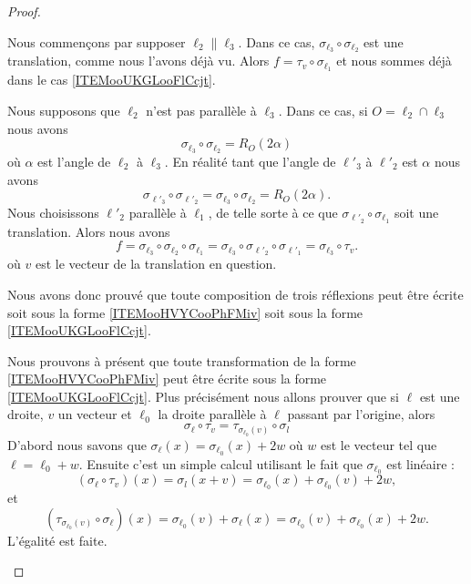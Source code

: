 \begin{proof}
\begin{subproof}
            Nous commençons par supposer \( \ell_2\parallel\ell_3\). Dans ce cas, \( \sigma_{\ell_3}\circ\sigma_{\ell_2}\) est une translation, comme nous l'avons déjà vu. Alors \( f= \tau_v\circ\sigma_{\ell_1}\) et nous sommes déjà dans le cas \ref{ITEMooUKGLooFlCcjt}.

            Nous supposons que \( \ell_2\) n'est pas parallèle à \( \ell_3\). Dans ce cas, si \( O=\ell_2\cap\ell_3\) nous avons 
            \begin{equation}
                \sigma_{\ell_3}\circ\sigma_{\ell_2}=R_O(2\alpha)
            \end{equation}
            où \( \alpha\) est l'angle de \( \ell_2\) à \( \ell_3\). En réalité tant que l'angle de \( \ell'_3\) à \( \ell'_2\) est \( \alpha\) nous avons
            \begin{equation}
                \sigma_{\ell'_3}\circ\sigma_{\ell'_2}= \sigma_{\ell_3}\circ\sigma_{\ell_2}=R_O(2\alpha).
            \end{equation}
            Nous choisissons \( \ell'_2\) parallèle à \( \ell_1\), de telle sorte à ce que \( \sigma_{\ell'_2}\circ\sigma_{\ell_1}\) soit une translation. Alors nous avons
            \begin{equation}
                f=\sigma_{\ell_3}\circ\sigma_{\ell_2}\circ\sigma_{\ell_1}=\sigma_{\ell_3}\circ\sigma_{\ell'_2}\circ\sigma_{\ell'_1}=\sigma_{\ell_3}\circ\tau_v.
            \end{equation}
            où \( v\) est le vecteur de la translation en question.

            Nous avons donc prouvé que toute composition de trois réflexions peut être écrite soit sous la forme \ref{ITEMooHVYCooPhFMiv} soit sous la forme \ref{ITEMooUKGLooFlCcjt}.

            Nous prouvons à présent que toute transformation de la forme \ref{ITEMooHVYCooPhFMiv} peut être écrite sous la forme \ref{ITEMooUKGLooFlCcjt}. Plus précisément nous allons prouver que si \( \ell\) est une droite, \( v\) un vecteur et \( \ell_0\) la droite parallèle à \( \ell\) passant par l'origine, alors
            \begin{equation}
                \sigma_{\ell}\circ\tau_v=\tau_{\sigma_{\ell_0}(v)}\circ\sigma_l
            \end{equation}
            D'abord nous savons que \( \sigma_{\ell}(x)=\sigma_{\ell_0}(x)+2w\) où \( w\) est le vecteur tel que \( \ell=\ell_0+w\). Ensuite c'est un simple calcul utilisant le fait que \( \sigma_{\ell_0}\) est linéaire :
            \begin{equation}
                (\sigma_{\ell}\circ\tau_v)(x)=\sigma_l(x+v)=\sigma_{\ell_0}(x)+\sigma_{\ell_0}(v)+2w,
            \end{equation}
            et
            \begin{equation}
                (\tau_{\sigma_{\ell_0}(v)}\circ\sigma_{\ell})(x)=\sigma_{\ell_0}(v)+\sigma_{\ell}(x)=\sigma_{\ell_0}(v)+\sigma_{\ell_0}(x)+2w.
            \end{equation}
            L'égalité est faite.


\end{subproof}
\end{proof}
